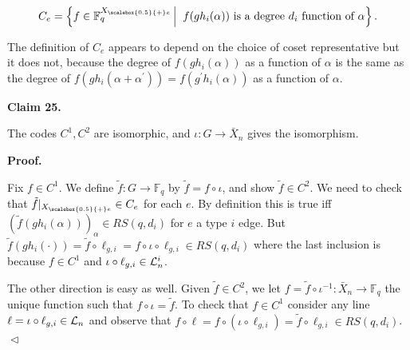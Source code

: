 \[\begin{gathered}
C_{e}=\left\{f\in\mathbb{F}_{q}^{{X}_{\scalebox{0.5}{+}e}}\left|\;\vphantom{f\in\mathbb{F}_{q}^{{X}_{\scalebox{0.5}{+}e}}f(gh_{i}(\alpha))\hbox{ is a degree }d_{i}\hbox{ function of }\alpha}\right.f(gh_{i}(\alpha))\hbox{ is a degree }d_{i}\hbox{ function of }\alpha\right\}.
\end{gathered}\]


The definition of $C_{e}$ appears to depend on the choice of coset representative but it does not, because the degree of $f(gh_{i}(\alpha))$ as a function of $\alpha$ is the same as the degree of $f(gh_{i}(\alpha+\alpha^{\prime}))=f(g^{\prime}h_{i}(\alpha))$ as a function of $\alpha$.\par





\par\medskip\noindent\textbf{
Claim 25. 
}\par



The codes $C^{1},C^{2}$ are isomorphic, and $\iota:G\to\bar{X}_{n}$ gives the isomorphism.\par






\par\medskip\noindent\textbf{
\textbf{Proof}.}\par




Fix $f\in C^{1}$. We define $\tilde{f}:G\to\mathbb{F}_{q}$ by $\tilde{f}=f\circ\iota$, and show $\tilde{f}\in C^{2}$.
We need to check that $\tilde{f}|_{{X}_{\scalebox{0.5}{+}e}}\in C_{e}$ for each $e$.
By definition this is true iff $(\tilde{f}(gh_{i}(\alpha)))_{\alpha}\in RS(q,d_{i})$ for $e$ a type $i$ edge. But $\tilde{f}(gh_{i}(\cdot))=\tilde{f}\circ\ell_{g,i}=f\circ\iota\circ\ell_{g,i}\in RS(q,d_{i})$ where the last inclusion is because $f\in C^{1}$ and $\iota\circ\ell_{g,i}\in{\cal L}_{n}^{i}$.\par




The other direction is easy as well. Given $\tilde{f}\in C^{2}$, we let $f=\tilde{f}\circ\iota^{-1}:\bar{X}_{n}\to\mathbb{F}_{q}$ the unique function such that $f\circ\iota=\tilde{f}$. To check that $f\in C^{1}$ consider any line $\ell=\iota\circ\ell_{g,i}\in{\cal L}_{n}$ and observe that $f\circ\ell=f\circ(\iota\circ\ell_{g,i})=\tilde{f}\circ\ell_{g,i}\in RS(q,d_{i})$.
$\vartriangleleft$\par




